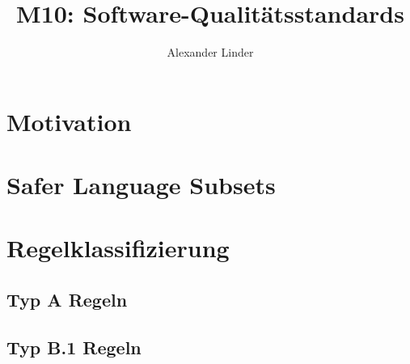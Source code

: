\documentclass{beamer}
\title{M10: Software-Qualitätsstandards}
\author{Alexander Linder}
\date{} %
\begin{document}

    \begin{frame}
        \maketitle
    \end{frame}

    \begin{frame}
        \tableofcontents
    \end{frame}

    \section{Motivation}
    \label{sec:motivation}
    \begin{frame}
        
    \end{frame}

    \section{Safer Language Subsets}
    \label{sec:safer-language-subsets}
    \begin{frame}

    \end{frame}

    \section{Regelklassifizierung}
    \label{sec:regelklassifizierung}
    \begin{frame}

    \end{frame}

    \subsection{Typ A Regeln}
    \label{subsec:typ-a-regeln}
    \begin{frame}

    \end{frame}

    \subsection{Typ B.1 Regeln}
    \label{subsec:typ-b-1-regeln}
    \begin{frame}

    \end{frame}
\end{document}
